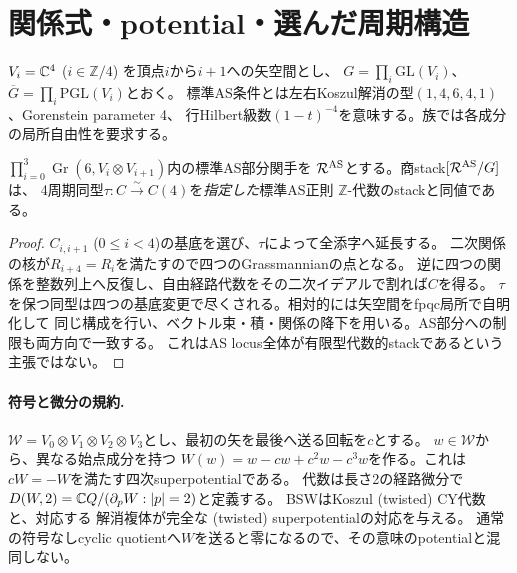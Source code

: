 \section{関係式・potential・選んだ周期構造}\label{sec:period-stack}
$V_i=\mathbb C^4$ ($i\in\mathbb Z/4$) を頂点$i$から$i+1$への矢空間とし、
$G=\prod_i\mathrm{GL}(V_i)$、$\overline G=\prod_i\mathrm{PGL}(V_i)$とおく。
標準AS条件とは左右Koszul解消の型$(1,4,6,4,1)$、Gorenstein parameter 4、
行Hilbert級数$(1-t)^{-4}$を意味する。族では各成分の局所自由性を要求する。

\begin{proposition}[任意の周期を保持する関係式模型]\label{prop:relation-period}
$\prod_{i=0}^3\operatorname{Gr}(6,V_i\otimes V_{i+1})$内の標準AS部分関手を
$\mathcal R^{\rm AS}$とする。商stack$[\mathcal R^{\rm AS}/G]$は、
4周期同型$\tau:C\xrightarrow{\sim}C(4)$を\emph{指定した}標準AS正則
$\mathbb Z$-代数のstackと同値である。
\end{proposition}
\begin{proof}
$C_{i,i+1}$ ($0\le i<4$)の基底を選び、$\tau$によって全添字へ延長する。
二次関係の核が$R_{i+4}=R_i$を満たすので四つのGrassmannianの点となる。
逆に四つの関係を整数列上へ反復し、自由経路代数をその二次イデアルで割れば$C$を得る。
$\tau$を保つ同型は四つの基底変更で尽くされる。相対的には矢空間をfpqc局所で自明化して
同じ構成を行い、ベクトル束・積・関係の降下を用いる。AS部分への制限も両方向で一致する。
これはAS locus全体が有限型代数的stackであるという主張ではない。
\end{proof}

\paragraph{符号と微分の規約.}
$\mathcal W=V_0\otimes V_1\otimes V_2\otimes V_3$とし、最初の矢を最後へ送る回転を$c$とする。
$w\in\mathcal W$から、異なる始点成分を持つ
$W(w)=w-cw+c^2w-c^3w$を作る。これは$cW=-W$を満たす四次superpotentialである。
代数は長さ2の経路微分で$D(W,2)=\mathbb C Q/(\partial_pW:|p|=2)$と定義する。
BSW\cite[Theorems 6.2, 6.8]{BSW}はKoszul (twisted) CY代数と、対応する
解消複体が完全な (twisted) superpotentialの対応を与える。
通常の符号なしcyclic quotientへ$W$を送ると零になるので、その意味のpotentialと混同しない。

